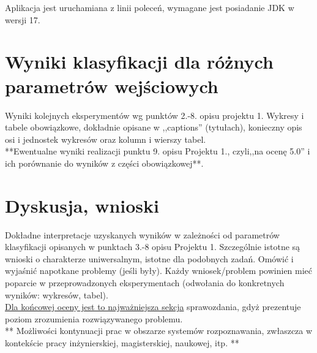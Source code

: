 \documentclass{classrep}
\begin{document}
Aplikacja jest uruchamiana z linii poleceń, wymagane jest posiadanie JDK w wersji 17. 


\section{Wyniki klasyfikacji dla różnych parametrów wejściowych}
Wyniki kolejnych eksperymentów wg punktów 2.-8. opisu projektu 1.  Wykresy i tabele
obowiązkowe, dokładnie opisane w ,,captions'' (tytułach), konieczny opis osi i
jednostek wykresów oraz kolumn i wierszy tabel.\\ 

{**Ewentualne wyniki realizacji punktu 9. opisu Projektu 1., czyli,,na ocenę 5.0'' i ich porównanie do wyników z
części obowiązkowej**.}\\



\section{Dyskusja, wnioski}
Dokładne interpretacje uzyskanych wyników w zależności od parametrów klasyfikacji
opisanych w punktach 3.-8 opisu Projektu 1. 
Szczególnie istotne są wnioski o charakterze uniwersalnym, istotne dla podobnych zadań. 
Omówić i wyjaśnić napotkane problemy (jeśli były). Każdy wniosek/problem powinien mieć poparcie
w przeprowadzonych eksperymentach (odwołania do konkretnych wyników: wykresów,
tabel). \\
\underline{Dla końcowej oceny jest to najważniejsza sekcja} sprawozdania, gdyż prezentuje poziom
zrozumienia rozwiązywanego problemu.\\

** Możliwości kontynuacji prac w obszarze systemów rozpoznawania, zwłaszcza w kontekście pracy inżynierskiej,
magisterskiej, naukowej, itp. **\\

\end{document}
